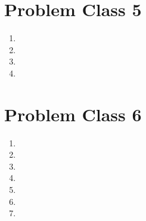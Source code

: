 \section{Problem Class 5}
	\begin{enumerate}
		\item
		\item
		\item
		\item
	\end{enumerate}

\section{Problem Class 6}
	\begin{enumerate}
		\item
		\item
		\item
		\item
		\item
		\item
		\item
	\end{enumerate}
